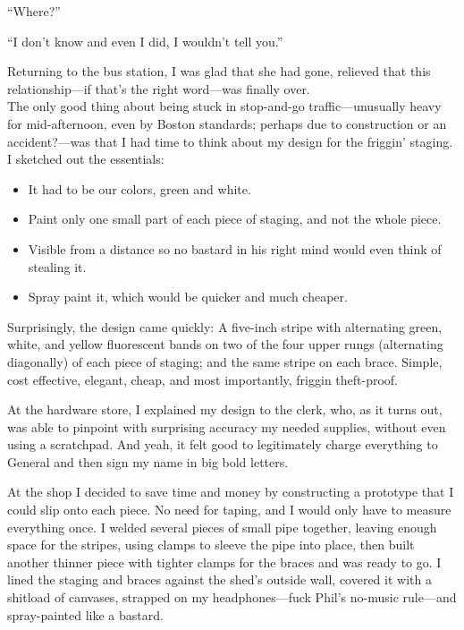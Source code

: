 ``Where?''

``I don't know and even I did, I wouldn't tell you.''

Returning to the bus station, I was glad that she had gone, relieved
that this relationship---if that's the right word---was finally over.\\

The only good thing about being stuck in stop-and-go traffic---unusually
heavy for mid-afternoon, even by Boston standards; perhaps due to
construction or an accident?---was that I had time to think about my
design for the friggin' staging. I sketched out the essentials:

\begin{itemize}
\tightlist
\item
  It had to be our colors, green and white.
\item
  Paint only one small part of each piece of staging, and not the whole
  piece.
\item
  Visible from a distance so no bastard in his right mind would even
  think of stealing it.
\item
  Spray paint it, which would be quicker and much cheaper.
\end{itemize}

Surprisingly, the design came quickly: A five-inch stripe with
alternating green, white, and yellow fluorescent bands on two of the
four upper rungs (alternating diagonally) of each piece of staging; and
the same stripe on each brace. Simple, cost effective, elegant, cheap,
and most importantly, friggin theft-proof.

At the hardware store, I explained my design to the clerk, who, as it
turns out, was able to pinpoint with surprising accuracy my needed
supplies, without even using a scratchpad. And yeah, it felt good to
legitimately charge everything to General and then sign my name in big
bold letters.

At the shop I decided to save time and money by constructing a prototype
that I could slip onto each piece. No need for taping, and I would only
have to measure everything once. I welded several pieces of small pipe
together, leaving enough space for the stripes, using clamps to sleeve
the pipe into place, then built another thinner piece with tighter
clamps for the braces and was ready to go. I lined the staging and
braces against the shed's outside wall, covered it with a shitload of
canvases, strapped on my headphones---fuck Phil's no-music rule---and
spray-painted like a bastard.

